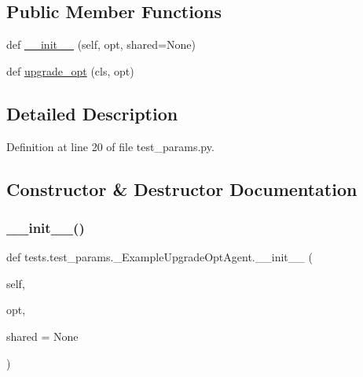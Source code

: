 \subsection*{Public Member Functions}
\begin{DoxyCompactItemize}
\item 
def \hyperlink{classtests_1_1test__params_1_1__ExampleUpgradeOptAgent_acef7f1764706efba76b8f106e90b53cc}{\+\_\+\+\_\+init\+\_\+\+\_\+} (self, opt, shared=None)
\item 
def \hyperlink{classtests_1_1test__params_1_1__ExampleUpgradeOptAgent_ad842b65ef0ce493c7644622aae6e17dc}{upgrade\+\_\+opt} (cls, opt)
\end{DoxyCompactItemize}


\subsection{Detailed Description}


Definition at line 20 of file test\+\_\+params.\+py.



\subsection{Constructor \& Destructor Documentation}
\mbox{\label{classtests_1_1test__params_1_1__ExampleUpgradeOptAgent_acef7f1764706efba76b8f106e90b53cc}} 
\subsubsection{\texorpdfstring{\+\_\+\+\_\+init\+\_\+\+\_\+()}{\_\_init\_\_()}}
{\footnotesize\ttfamily def tests.\+test\+\_\+params.\+\_\+\+Example\+Upgrade\+Opt\+Agent.\+\_\+\+\_\+init\+\_\+\+\_\+ (\begin{DoxyParamCaption}\item[{}]{self,  }\item[{}]{opt,  }\item[{}]{shared = {\ttfamily None} }\end{DoxyParamCaption})}



